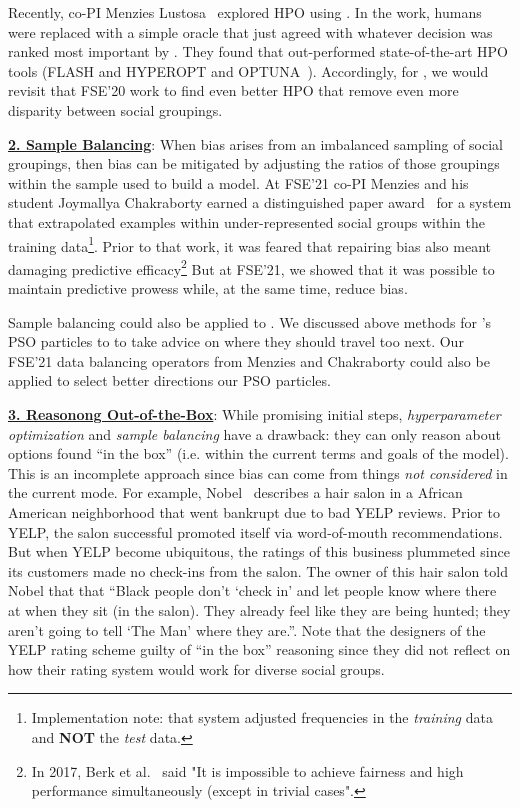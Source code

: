  Recently, co-PI Menzies    Lustosa~\cite{lustosa22}   explored HPO using {\ITT}.  
 In the work, humans were replaced with a simple oracle that just agreed with whatever decision was ranked most important by {\ITT}. 
 They found that {\ITT} out-performed state-of-the-art HPO tools 
 (FLASH and HYPEROPT and OPTUNA~\cite{bergstra2015hyperopt,nair18,akiba2019optuna}). 
 Accordingly,  for , we would
   revisit that FSE'20 work to  find even better HPO that remove even more disparity between social groupings. 

  
 
\noindent\underline{\bf 2. Sample Balancing}: 
  When bias arises from an imbalanced
  sampling of   social groupings, then bias can be mitigated by
  adjusting the ratios of those   groupings within the sample
  used to build a model.
  At  FSE'21 co-PI Menzies
 and his student  Joymallya Chakraborty earned a distinguished paper award~\cite{fse21} 
 for a system that extrapolated examples within under-represented social groups within the training data\footnote{Implementation note: that system adjusted frequencies in the 
 {\em training} data and {\bf NOT} the {\em test} data.}.
  Prior to that work, it was  feared   that repairing bias also meant damaging predictive efficacy\footnote{
In 2017,    Berk et al.~\cite{berk2017fairness}   said
"It is impossible to achieve fairness and high performance simultaneously (except in trivial cases".}
But at FSE'21, we    showed that it was   possible to maintain predictive prowess while, at the same time,  reduce bias.

Sample balancing could also be applied to .
We discussed above methods for {\IT}'s PSO 
 particles to to take advice
 on where they should travel too next. Our FSE'21  data balancing operators 
 from  Menzies and Chakraborty could also be applied to select better directions
 our PSO particles.

   

\noindent\underline{\bf 3. Reasonong Out-of-the-Box}: 
While promising initial steps, {\em hyperparameter optimization}
 and {\em sample balancing}   have   a drawback: they can only reason about  options   found ``in the box'' (i.e. within the current terms and goals of the model).
 This is an incomplete approach since bias can come from things {\em not considered} in the current mode.  For  example,
 Nobel~\cite{noble2018algorithms}   describes a hair salon in a   African American neighborhood that went bankrupt due to bad YELP reviews.  
Prior to YELP, the  salon successful promoted itself    via word-of-mouth recommendations. But when   YELP become ubiquitous, the   ratings of this business plummeted since its customers made no check-ins from the salon.    
The owner of this hair salon told Nobel that   that ``Black people don't `check in' and let people know where there at when they sit (in the salon). They already feel like they are being hunted; they aren't going to tell `The Man' where they are.''.   Note that the designers of the YELP rating scheme guilty of ``in the box'' reasoning since they
did not reflect on how their rating system would work for diverse social groups.

